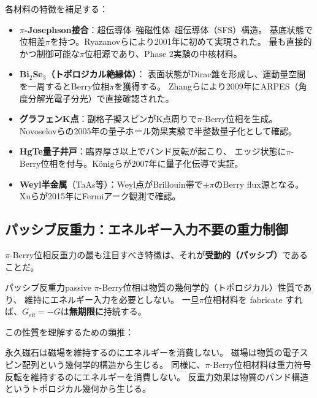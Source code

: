 \documentclass[11pt,a4paper]{article}
\newcommand{\Geff}{G_{\mathrm{eff}}}
\begin{document}
\noindent
各材料の特徴を補足する：

\begin{itemize}[leftmargin=2em]
\item \textbf{$\pi$-Josephson接合}：超伝導体--強磁性体--超伝導体（SFS）構造。
基底状態で位相差$\pi$を持つ。Ryazanovらにより2001年に初めて実現された。
最も直接的かつ制御可能な$\pi$位相源であり、Phase 2実験の中核材料。

\item \textbf{Bi$_2$Se$_3$（トポロジカル絶縁体）}：
表面状態がDirac錐を形成し、運動量空間を一周するとBerry位相$\pi$を獲得する。
Zhangらにより2009年にARPES（角度分解光電子分光）で直接確認された。

\item \textbf{グラフェンK点}：副格子擬スピンがK点周りで$\pi$-Berry位相を生成。
Novoselovらの2005年の量子ホール効果実験で半整数量子化として確認。

\item \textbf{HgTe量子井戸}：臨界厚さ以上でバンド反転が起こり、
エッジ状態に$\pi$-Berry位相を付与。K\"onigらが2007年に量子化伝導で実証。

\item \textbf{Weyl半金属}（TaAs等）：Weyl点がBrillouin帯で$\pm\pi$のBerry flux源となる。
Xuらが2015年にFermiアーク観測で確認。
\end{itemize}


\subsection{パッシブ反重力：エネルギー入力不要の重力制御}
\label{sec:12.3}

$\pi$-Berry位相反重力の最も注目すべき特徴は、それが\textbf{受動的（パッシブ）}であることだ。

\begin{keyresult}{パッシブ反重力}{passive}
$\pi$-Berry位相は物質の幾何学的（トポロジカル）性質であり、
維持にエネルギー入力を必要としない。
一旦$\pi$位相材料を fabricate すれば、$\Geff = -G$は\textbf{無期限に}持続する。
\end{keyresult}

\noindent
この性質を理解するための類推：

\begin{tcolorbox}[colback=green!5!white, colframe=green!60!black, title=類推：永久磁石]
永久磁石は磁場を維持するのにエネルギーを消費しない。
磁場は物質の電子スピン配列という幾何学的構造から生じる。
同様に、$\pi$-Berry位相材料は重力符号反転を維持するのにエネルギーを消費しない。
反重力効果は物質のバンド構造というトポロジカル幾何から生じる。
\end{tcolorbox}
\end{document}
